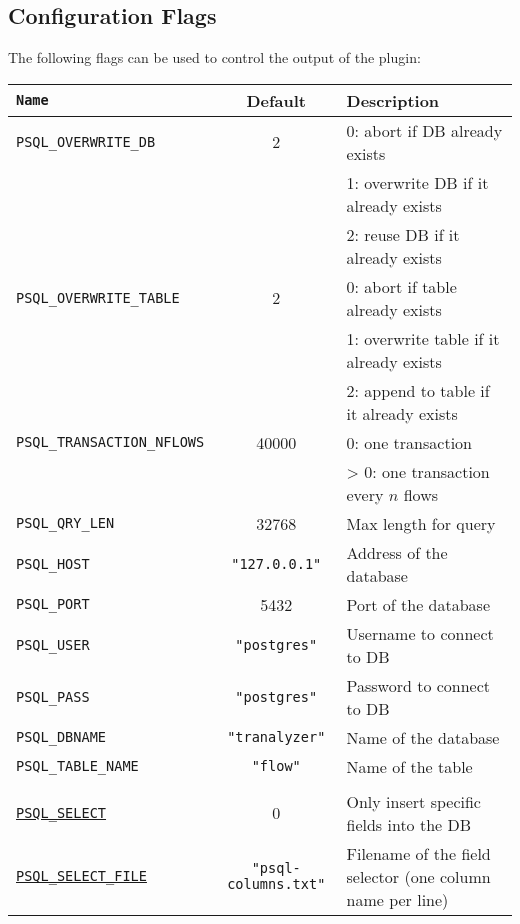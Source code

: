 \documentclass[documentation]{subfiles}
\begin{document}
\subsection{Configuration Flags}
The following flags can be used to control the output of the plugin:
\begin{longtable}{>{\tt}lcl}
    \toprule
    {\bf Name} & {\bf Default} & {\bf Description}\\
    \midrule\endhead%
    PSQL\_OVERWRITE\_DB       & 2                        & 0: abort if DB already exists\\
                              &                          & 1: overwrite DB if it already exists\\
                              &                          & 2: reuse DB if it already exists\\
    PSQL\_OVERWRITE\_TABLE    & 2                        & 0: abort if table already exists\\
                              &                          & 1: overwrite table if it already exists\\
                              &                          & 2: append to table if it already exists\\
    PSQL\_TRANSACTION\_NFLOWS & 40000                    & 0: one transaction\\
                              &                          & > 0: one transaction every $n$ flows\\
    PSQL\_QRY\_LEN            & 32768                    & Max length for query\\
    PSQL\_HOST                & {\tt\small "127.0.0.1"}  & Address of the database\\
    PSQL\_PORT                & 5432                     & Port of the database\\
    PSQL\_USER                & {\tt\small "postgres"}   & Username to connect to DB\\
    PSQL\_PASS                & {\tt\small "postgres"}   & Password to connect to DB\\
    PSQL\_DBNAME              & {\tt\small "tranalyzer"} & Name of the database\\
    PSQL\_TABLE\_NAME         & {\tt\small "flow"}       & Name of the table\\
    \\
    \hyperref[psql:select]{PSQL\_SELECT}
                              & 0                        & Only insert specific fields into the DB\\
    \hyperref[psql:select]{PSQL\_SELECT\_FILE}
                              & {\small\tt "psql-columns.txt"}
                                                   & Filename of the field selector (one column name per line)\\
    \bottomrule
\end{longtable}
\end{document}
